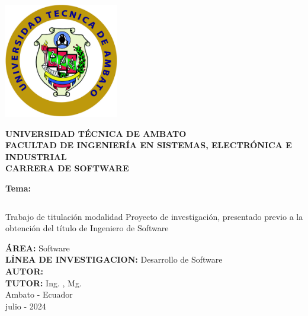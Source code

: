 \begin{titlepage}
	\begin{center}

		\includegraphics[width=50mm]{resources/images/logo-uta.png}

		\textbf{\uppercase{
				Universidad Técnica de Ambato \\
				\vspace{5mm}
				Facultad de Ingeniería en sistemas, electrónica e industrial \\
				\vspace{5mm}
				carrera de software \\
			}}

		\vspace{5mm}
		\textbf{Tema:}
		\vspace{5mm}

		\begin{tabular}[c]{>{\centering\arraybackslash}p{}}
			\toprule
			{\bfseries\MakeUppercase\tema} \\
			\bottomrule
		\end{tabular}

		\vspace{24pt}
		Trabajo de titulación modalidad Proyecto de investigación, presentado
		previo a la obtención del título de Ingeniero de Software

		\vspace{5mm}
		\textbf{\uppercase{área:}} Software\\
		\vspace{5mm}
		\textbf{\uppercase{línea de investigacion:}} Desarrollo de Software\\
		\vspace{5mm}
		\textbf{\uppercase{autor:}} \autor \\
		\vspace{5mm}
		\textbf{\uppercase{tutor:}} Ing. \tutor, Mg.\\

		\vfill
		Ambato - Ecuador\\
		julio - 2024
	\end{center}
\end{titlepage}
